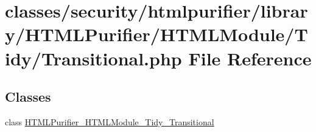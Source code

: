 \hypertarget{Transitional_8php}{\section{classes/security/htmlpurifier/library/\+H\+T\+M\+L\+Purifier/\+H\+T\+M\+L\+Module/\+Tidy/\+Transitional.php File Reference}
\label{Transitional_8php}
}
\subsection*{Classes}
\begin{DoxyCompactItemize}
\item 
class \hyperlink{classHTMLPurifier__HTMLModule__Tidy__Transitional}{H\+T\+M\+L\+Purifier\+\_\+\+H\+T\+M\+L\+Module\+\_\+\+Tidy\+\_\+\+Transitional}
\end{DoxyCompactItemize}
